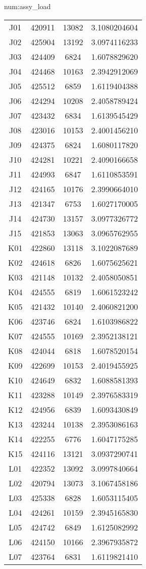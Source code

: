 \begin{numitem}{num:assy_load}
\begin{center}
\begin{longtable}{c c c c}
J01&420911&13082&3.1080204604\\
J02&425904&13192&3.0974116233\\
J03&424409&6824 &1.6078829620\\
J04&424468&10163&2.3942912069\\
J05&425512&6859 &1.6119404388\\
J06&424294&10208&2.4058789424\\
J07&423432&6834 &1.6139545429\\
J08&423016&10153&2.4001456210\\
J09&424375&6824 &1.6080117820\\
J10&424281&10221&2.4090166658\\
J11&424993&6847 &1.6110853591\\
J12&424165&10176&2.3990664010\\
J13&421347&6753 &1.6027170005\\
J14&424730&13157&3.0977326772\\
J15&421853&13063&3.0965762955\\
K01&422860&13118&3.1022087689\\
K02&424618&6826 &1.6075625621\\
K03&421148&10132&2.4058050851\\
K04&424555&6819 &1.6061523242\\
K05&421432&10140&2.4060821200\\
K06&423746&6824 &1.6103986822\\
K07&424555&10169&2.3952138121\\
K08&424044&6818 &1.6078520154\\
K09&422699&10153&2.4019455925\\
K10&424649&6832 &1.6088581393\\
K11&423288&10149&2.3976583319\\
K12&424956&6839 &1.6093430849\\
K13&423244&10138&2.3953086163\\
K14&422255&6776 &1.6047175285\\
K15&424116&13121&3.0937290741\\
L01&422352&13092&3.0997840664\\
L02&420794&13073&3.1067458186\\
L03&425338&6828 &1.6053115405\\
L04&424261&10159&2.3945165830\\
L05&424742&6849 &1.6125082992\\
L06&424150&10166&2.3967935872\\
L07&423764&6831 &1.6119821410\\

\end{longtable}
\end{center}
\end{numitem}
